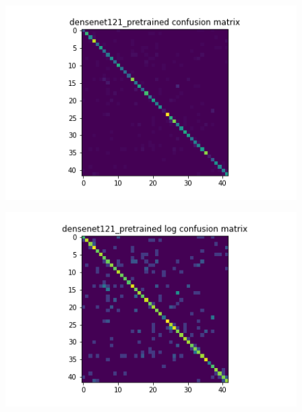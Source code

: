 \begin{figure}[H]
  \begin{minipage}[b]{.5\linewidth}
    \centering
    {\includegraphics[width=1.2\textwidth]{figs/conf_matrix/densenet121_pretrained_conf.png}}
  \end{minipage}
  \hfill
  \begin{minipage}[b]{.5\linewidth}
    \centering

    {\includegraphics[width=1.2\textwidth]{figs/conf_matrix/densenet121_pretrained_log_conf.png}}
  \end{minipage}
  \vfill
  \begin{minipage}[b]{.5\linewidth}
    \centering


\end{minipage}
\end{figure}
